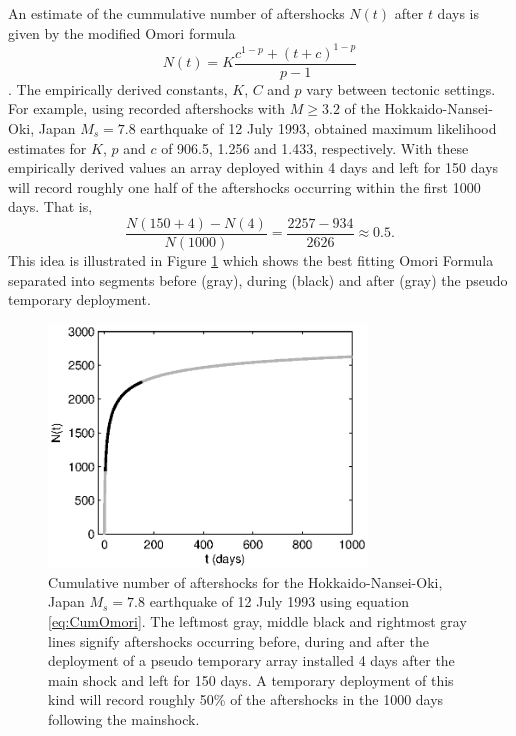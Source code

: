 \documentclass[extra]{gji}
\begin{document}
An estimate of the cummulative number of aftershocks $N(t)$ after
$t$ days is given by the modified Omori formula
\begin{equation}
\label{eq:CumOmori}
 N(t) = K \frac{c^{1-p} + (t+c)^{1-p}}{p-1}
\end{equation}
\citep{dr_Utsu95a}.
The empirically derived constants, $K$, $C$ and $p$ vary between
tectonic settings. For example, using recorded aftershocks with
$M\ge3.2$ of the  Hokkaido-Nansei-Oki, Japan $M_s=7.8$ earthquake of
12 July 1993, \citet{dr_Utsu95a} obtained maximum likelihood
estimates for $K$, $p$ and $c$ of 906.5, 1.256 and 1.433,
respectively.  With these empirically derived values an array
deployed within 4 days and left for 150 days will record roughly one
half of the aftershocks occurring within the first 1000 days. That
is,
\begin{equation}
\frac{N(150+4)-N(4)}{N(1000)} = \frac{2257-934}{2626} \approx 0.5.
\end{equation}
This idea is illustrated in Figure \ref{fig:Omorifigure} which shows
the best fitting Omori Formula separated into segments before
(gray), during (black) and after (gray) the pseudo temporary
deployment.

\begin{figure}
\noindent\includegraphics[width = 20pc]{diags/OmoriFigure.eps}
\caption{Cumulative number of aftershocks for the
Hokkaido-Nansei-Oki, Japan $M_s=7.8$ earthquake of 12 July 1993
using equation \ref{eq:CumOmori}. The leftmost gray, middle black
and rightmost gray lines signify aftershocks occurring before,
during and after the deployment of a pseudo temporary array
installed 4 days after the main shock and left for 150 days. A
temporary deployment of this kind will record roughly 50\% of the
aftershocks in the 1000 days following the mainshock. }
\label{fig:Omorifigure}
\end{figure}
\end{document}
